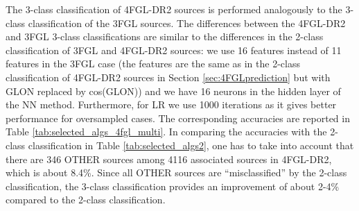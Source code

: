 \documentclass{aa}
\begin{document}
\begin{table}[!h]
    \caption{
    Comparison of classes predicted for unassociated sources in the 3FGL catalog using 3-class classification
    with associations in the 4FGL-DR2 catalog.}
    \label{tab:3FGL_vs_4FGL_3class}

\centering
{}
\end{table}



The 3-class classification of 4FGL-DR2 sources is performed analogously to the 3-class classification of the 3FGL sources.
The differences between the 4FGL-DR2 and 3FGL 3-class classifications are similar to the differences in the 2-class classification of 3FGL and 4FGL-DR2 sources:
we use 16 features instead of 11 features in the 3FGL case (the features are the same as in the 2-class classification of 4FGL-DR2 sources in Section \ref{sec:4FGLprediction} but with GLON replaced by cos(GLON))
and we have 16 neurons in the hidden layer of the NN method. Furthermore, for LR we use 1000 iterations as it gives better performance for oversampled cases.
The corresponding accuracies are reported in Table \ref{tab:selected_algs_4fgl_multi}.
In comparing the accuracies with the 2-class classification in Table \ref{tab:selected_algs2}, 
one has to take into account that there are 346 OTHER sources among 4116 associated sources in 4FGL-DR2, which is about 8.4\%.
Since all OTHER sources are ``misclassified'' by the 2-class classification, the 3-class classification provides an improvement of about 2-4\% compared to the 2-class classification.
\end{document}

